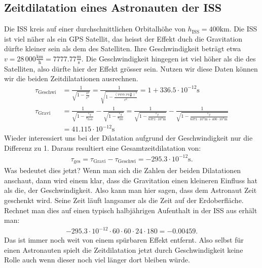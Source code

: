 \begin{refsection}
\subsection{Zeitdilatation eines Astronauten der ISS}
Die ISS kreis auf einer durchschnittlichen Orbitalhöhe von \( h_{\text{ISS}} = 400\text{km} \). Die ISS ist viel näher als ein GPS Satellit, das heisst der Effekt duch die Gravitation dürfte kleiner sein als dem des Satelliten. Ihre Geschwindigkeit beträgt etwa \( v = 28\,000\frac{\text{km}}{\text{h}} = 7777.77\frac{\text{m}}{\text{s}} \). Die Geschwindigkeit hingegen ist viel höher als die des Satelliten, also dürfte hier der Effekt grösser sein. Nutzen wir diese Daten können wir die beiden Zeitdilatationen ausrechnen.
\begin{align*}
\tau_{\text{Geschwi}}
&=
\frac{1}{\sqrt{\displaystyle 1 - \frac{v^2}{c^2}}} = \frac{1}{\sqrt{\displaystyle 1 - \frac{( 7777.77\frac{\text{m}}{\text{s}})^2}{c^2}}} = 1 + 336.5 \cdot 10^{-12}\text{s}
\\
\tau_{\text{Gravi}}
&=
\frac{1}{\sqrt{\displaystyle 1-\frac{r_g}{r_{\text{Erde}}}}} - \frac{1}{\sqrt{\displaystyle 1-\frac{r_g}{r_{\text{ISS}}}}} 
= \frac{1}{\sqrt{\displaystyle 1-\frac{r_g}{6371 \cdot 10^3\text{m}}}} - \frac{1}{\sqrt{\displaystyle 1-\frac{r_g}{6371 \cdot 10^3\text{m} + 400 \cdot 10^3\text{m}}}}
\\
&= 41.115 \cdot 10^{-12}\text{s}
\end{align*}
Wieder interessiert uns bei der Dilatation aufgrund der Geschwindigkeit nur die Differenz zu 1. Daraus resultiert eine Gesamtzeitdilatation von:
\begin{align*}
\tau_{\text{ges}} = \tau_{\text{Gravi}} - \tau_{\text{Geschwi}} = -295.3 \cdot 10^{-12}\text{s}.
\end{align*}
Was bedeutet dies jetzt? Wenn man sich die Zahlen der beiden Dilatationen anschaut, dann wird einem klar, dass die Gravitation einen kleineren Einfluss hat als die, der Geschwindigkeit. Also kann man hier sagen, dass dem Astronaut Zeit geschenkt wird. Seine Zeit läuft langsamer als die Zeit auf der Erdoberfläche. Rechnet man dies auf einen typisch halbjährigen Aufenthalt in der ISS aus erhält man:
\begin{align*}
-295.3 \cdot 10^{-12} \cdot 60 \cdot 60 \cdot 24 \cdot 180 = -0.00459.
\end{align*}
Das ist immer noch weit von einem spürbaren Effekt entfernt. Also selbst für einen Astronauten spielt die Zeitdilatation jetzt durch Geschwindigkeit keine Rolle auch wenn dieser noch viel länger dort bleiben würde.


\end{refsection}
